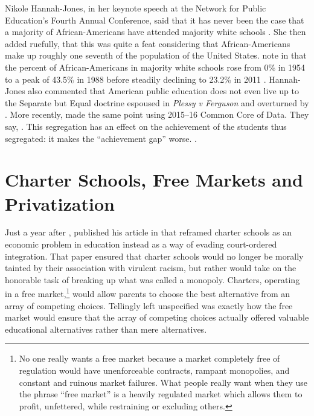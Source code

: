 Nikole Hannah-Jones, in her keynote speech at the Network for Public Education's Fourth Annual Conference, said that it has never been the case that a majority of African-Americans have attended majority white schools \parencite{Hannah-Jones2017}. She then added ruefully, that this was quite a feat considering that African-Americans make up roughly one seventh of the population of the United States. \citeauthor{Orfield.Frankenberg2014} note in that the percent of African-Americans in majority white schools rose from 0\% in 1954 to a peak of 43.5\% in 1988 before steadily declining to 23.2\% in 2011 \parencites()(Table 3: Percent of Black Students in Majority White Schools, 1954–2011)[10]{Orfield.Frankenberg2014}. Hannah-Jones also commented that American public education does not even live up to the Separate but Equal doctrine espoused in \textit{Plessy v Ferguson} and overturned by . More recently, \citeauthor{Heilig.etal2019a} made the same point using 2015--16 Common Core of Data. They say,
.
This segregation has an effect on the achievement of the students thus segregated: it makes the ``achievement gap'' worse.
.

\section{Charter Schools, Free Markets  and Privatization}\label{sec:freemarkets}\indent

Just a year after ,  \textcite{Friedman1955} published his article  in  \parencite{Friedman1955} that reframed charter schools as an economic problem in education instead as a way of evading court-ordered integration. That paper ensured that charter schools would no longer be morally tainted by their association with virulent racism, but rather would take on the honorable task of breaking up what was called a monopoly. Charters, operating in a free market,\footnote{No one really wants a free market because a  market completely free of regulation would have unenforceable contracts, rampant monopolies, and constant and ruinous market failures. What people really want when they use the phrase ``free market'' is a heavily regulated market which allows them to profit, unfettered, while restraining or excluding others.} would allow parents to choose the best alternative from an array of competing choices. Tellingly left unspecified was exactly how the free market would ensure that the array of competing choices actually offered valuable educational alternatives rather than mere alternatives.

